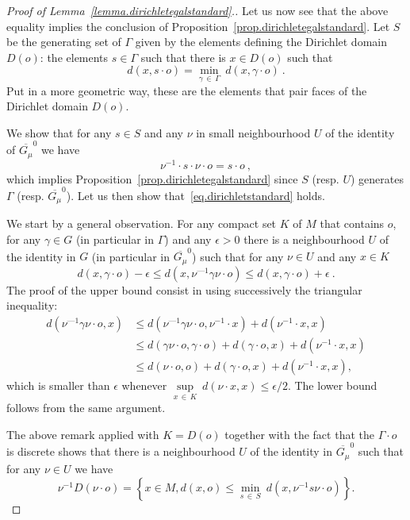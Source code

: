 \documentclass[AHL,Unicode,longabstracts,published]{cedram}
\newcommand{\mini}[1]{\underset{#1}{\min}}
\newcommand{\supr}[1]{\underset{#1}{\sup}}
\begin{document}
\begin{proof}[Proof of Lemma~\ref{lemma.dirichletegalstandard}.]
Let us now see that the above equality implies the conclusion of Proposition~\ref{prop.dirichletegalstandard}. Let $S$ be the generating set of $\Gamma$ given by the elements defining the Dirichlet domain $D(o)$: the elements $s \in \Gamma$ such that there is $x \in D(o) $ such that
\[
d(x, s \cdot o) = \mini{\gamma\,\in\,\Gamma} \ d(x, \gamma \cdot o) \ .
\]
Put in a more geometric way, these are the elements that pair faces of the Dirichlet domain $D(o)$.

We show that for any $s \in S$ and any $\nu$ in small neighbourhood $U$ of the identity of $\overline{G_{\mu}}^0$ we have
\begin{equation}\label{eq.dirichletstandard}
\nu^{-1} \cdot s \cdot \nu \cdot o = s \cdot o \ ,
\end{equation}
which implies Proposition~\ref{prop.dirichletegalstandard} since $S$ (resp. $U$) generates $\Gamma$ (resp. $\overline{G_{\mu}}^0$). Let us then show that~\eqref{eq.dirichletstandard} holds.


We start by a general observation. For any compact set $K$ of $M$ that contains $o$, for any $\gamma \in G$ (in particular in $\Gamma$) and any $\epsilon > 0$ there is a neighbourhood $U$ of the identity in $G$ (in particular in $\overline{G_{\mu}}^0$) such that for any $\nu \in U$ and any $x \in K$
\[
d(x, \gamma \cdot o) - \epsilon \le d\left(x, \nu^{—1} \gamma \nu \cdot o\right)
\le d(x, \gamma \cdot o) + \epsilon \ .
\]
The proof of the upper bound
consist in using successively the triangular inequality:
\begin{align*}
d\left(\nu^{—1} \gamma \nu \cdot o,x\right) & \le d\left(\nu^{—1} \gamma \nu \cdot o, \nu^{-1} \cdot x\right) + d\left(\nu^{-1} \cdot x, x\right) \\
& \le d(\gamma \nu \cdot o, \gamma \cdot o) + d(\gamma \cdot o,x) + d\left(\nu^{-1} \cdot x, x\right) \\
& \le d(\nu \cdot o, o) + d(\gamma \cdot o,x) + d\left(\nu^{-1} \cdot x, x\right),
\end{align*}
which is smaller than $\epsilon$ whenever $\supr{x\,\in\,K} \ d(\nu \cdot x, x) \le \epsilon/2$. The lower bound follows from the same argument.

The above remark applied with $K = D(o)$ together with the fact that the $\Gamma \cdot o$ is discrete shows that there is a neighbourhood $U$ of the identity in $\overline{G_{\mu}}^0$ such that for any $\nu \in U$ we have
\[
\nu^{-1} D(\nu \cdot o) = \left\{ x \in M , d(x, o) \le \mini{s\,\in\,S} \ d\left(x, \nu^{-1} s \nu \cdot o\right) \right\}.
\]


\end{proof}
\end{document}
